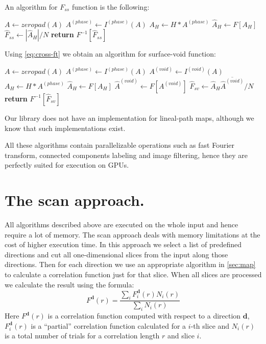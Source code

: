 \documentclass[reprint,amsmath,amssymb,aps,pre,showkeys,showpacs,nofootinbib]{revtex4-1}
\begin{document}
An algorithm for $F_{ss}$ function is the following:
\begin{algorithmic}[1]
    \State $A \gets zeropad(A)$
  \EndIf
  \State $A^{(phase)} \gets I^{(phase)} (A)$
  \State $A_H \gets H * A^{(phase)}$
  \State $\hat{A}_H \gets F[A_H]$
  \State $\hat{F}_{ss} \gets |\hat{A}_H| / N$
  \State \textbf{return} $F^{-1} [\hat{F}_{ss}]$
  \EndProcedure
\end{algorithmic}

Using \cref{eq:cross-ft} we obtain an algorithm for surface-void function:
\begin{algorithmic}[1]
    \State $A \gets zeropad(A)$
  \EndIf
  \State $A^{(phase)} \gets I^{(phase)} (A)$
  \State $A^{(void)} \gets I^{(void)} (A)$
  \State $A_H \gets H * A^{(phase)}$
  \State $\hat{A}_H \gets F[A_H]$
  \State $\hat{A}^{(void)} \gets F[A^{(void)}]$
  \State $\hat{F}_{sv} \gets \hat{A}_H \overline{\hat{A}^{(void)}} / N$
  \State \textbf{return} $F^{-1} [\hat{F}_{sv}]$
  \EndProcedure
\end{algorithmic}

Our library does not have an implementation for lineal-path maps, although we
know that such implementations exist.

All these algorithms contain parallelizable operations such as fast Fourier
transform, connected components labeling and image filtering, hence they are
perfectly suited for execution on GPUs.

\section{The scan approach.}
\label{sec:scan}
All algorithms described above are executed on the whole input and hence require
a lot of memory. The scan approach deals with memory limitations at the cost of
higher execution time. In this approach we select a list of predefined
directions and cut all one-dimensional slices from the input along those
directions. Then for each direction we use an appropriate algorithm in
\cref{sec:map} to calculate a correlation function just for that slice. When all
slices are processed we calculate the result using the formula:
\begin{equation*}
  F^{\bm{d}}(r) = \frac{\sum\limits_i F^{\bm{d}}_i(r) N_i(r)}{\sum\limits_i N_i(r)}
\end{equation*}
Here $F^{\bm{d}}(r)$ is a correlation function computed with respect to a
direction $\bm{d}$, $F^{\bm{d}}_i(r)$ is a ``partial'' correlation
function calculated for a $i$-th slice and $N_i(r)$ is a total number of trials
for a correlation length $r$ and slice $i$.
\end{document}

